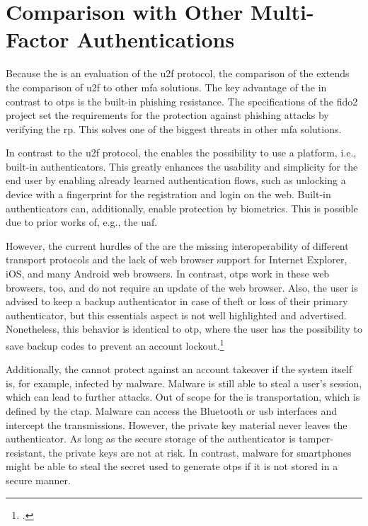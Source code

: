 \section{Comparison with Other Multi-Factor Authentications}
\label{chapter:comparison}

Because the \wa{} is an evaluation of the \gls{u2f} protocol, the comparison of the \wa{} extends the comparison of \gls{u2f} to other \gls{mfa} solutions. The key advantage of the \wa{} in contrast to \glspl{otp} is the built-in phishing resistance. The specifications of the \gls{fido}2 project set the requirements for the protection against phishing attacks by verifying the \gls{rp}. This solves one of the biggest threats in other \gls{mfa} solutions.

In contrast to the \gls{u2f} protocol, the \wa{} enables the possibility to use a platform, i.e., built-in authenticators. This greatly enhances the usability and simplicity for the end user by enabling already learned authentication flows, such as unlocking a device with a fingerprint for the registration and login on the web. Built-in authenticators can, additionally, enable protection by biometrics. This is possible due to prior works of, e.g., the \gls{uaf}.

 However, the current hurdles of the \wa{} are the missing interoperability of different transport protocols and the lack of web browser support for Internet Explorer, iOS, and many Android web browsers. In contrast, \glspl{otp} work in these web browsers, too, and do not require an update of the web browser. Also, the user is advised to keep a backup authenticator in case of theft or loss of their primary authenticator, but this essentials aspect is not well highlighted and advertised. Nonetheless, this behavior is identical to \gls{otp}, where the user has the possibility to save backup codes to prevent an account lockout.\footcites[See][36]{10.1007/978-3-319-45931-8_3}
 
 Additionally, the \wa{} cannot protect against an account takeover if the system itself is, for example, infected by malware. Malware is still able to steal a user's session, which can lead to further attacks. Out of scope for the \wa{} is transportation, which is defined by the \gls{ctap}. Malware can access the Bluetooth or \gls{usb} interfaces and intercept the transmissions. However, the private key material never leaves the authenticator. As long as the secure storage of the authenticator is tamper-resistant, the private keys are not at risk. In contrast, malware for smartphones might be able to steal the secret used to generate \glspl{otp} if it is not stored in a secure manner.
 
